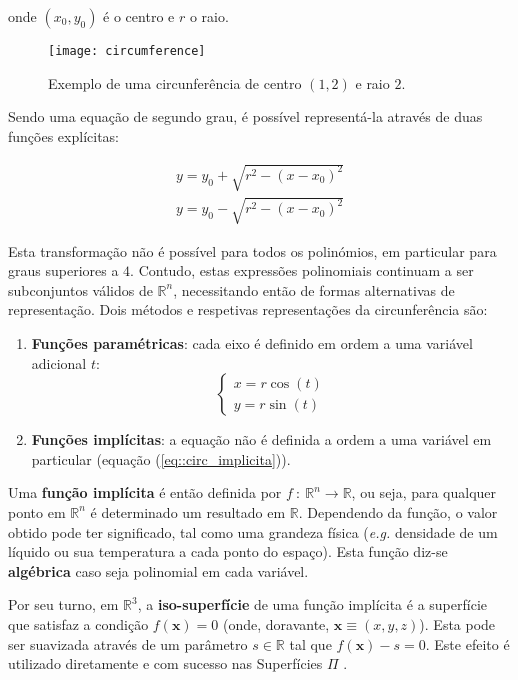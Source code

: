 onde $(x_0, y_0)$ é o centro e $r$ o raio.

\begin{figure}[!htbp]
	\centering
	\texttt{[image: circumference]}
	\caption[Exemplo de uma circunferência]{Exemplo de uma circunferência de centro $(1, 2)$ e raio $2$.}
	\label{fig::circumference}
\end{figure}

Sendo uma equação de segundo grau, é possível representá-la através de duas funções explícitas:

\begin{eqnarray}
		y = y_0 + \sqrt{r^2 - (x - x_0)^2} \\
		y = y_0 - \sqrt{r^2 - (x - x_0)^2}
\end{eqnarray}

Esta transformação não é possível para todos os polinómios, em particular para graus superiores a $4$. Contudo, estas expressões polinomiais continuam a ser subconjuntos válidos de $\mathbb{R}^n$, necessitando então de formas alternativas de representação. Dois métodos e respetivas representações da circunferência são:

\begin{enumerate}
	\item \textbf{Funções paramétricas}: cada eixo é definido em ordem a uma variável adicional $t$:
	\begin{equation}
		\left\{\begin{array}{l}
			x = r\cos(t) \\
			y = r\sin(t)
		\end{array}\right.
	\label{eq::circ_parametrica}
	\end{equation}
	
	\item \textbf{Funções implícitas}: a equação não é definida a ordem a uma variável em particular (equação (\ref{eq::circ_implicita})).
\end{enumerate}

Uma \textbf{função implícita} é então definida por $f~:~\mathbb{R}^n \longrightarrow \mathbb{R}$, ou seja, para qualquer ponto em $\mathbb{R}^n$ é determinado um resultado em $\mathbb{R}$. Dependendo da função, o valor obtido pode ter significado, tal como uma grandeza física (\textit{e.g.} densidade de um líquido ou sua temperatura a cada ponto do espaço). Esta função diz-se \textbf{algébrica} caso seja polinomial em cada variável.

Por seu turno, em $\mathbb{R}^3$, a \textbf{iso-superfície} de uma função implícita é a superfície que satisfaz a condição $f(\mathbf{x}) = 0$ (onde, doravante, $\mathbf{x} \equiv (x,y,z)$). Esta pode ser suavizada através de um parâmetro $s \in \mathbb{R}$ tal que $f(\mathbf{x}) - s = 0$. Este efeito é utilizado diretamente e com sucesso nas Superfícies $\Pi$ \cite{Raposo2019}.


